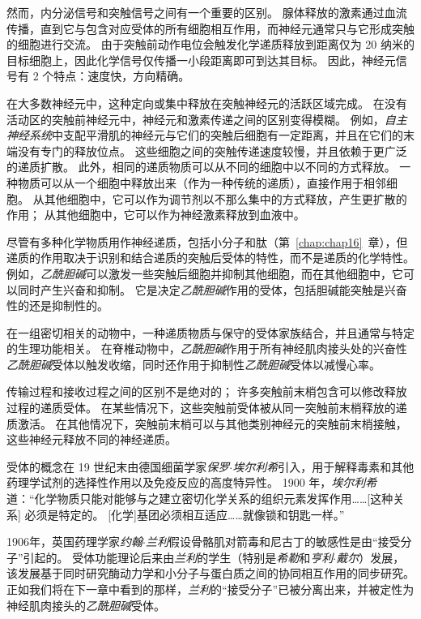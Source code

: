 然而，内分泌信号和突触信号之间有一个重要的区别。
腺体释放的激素通过血流传播，直到它与包含对应受体的所有细胞相互作用，而神经元通常只与它形成突触的细胞进行交流。
由于突触前动作电位会触发化学递质释放到距离仅为 20 纳米的目标细胞上，因此化学信号仅传播一小段距离即可到达其目标。 
因此，神经元信号有 2 个特点：速度快，方向精确。


在大多数神经元中，这种定向或集中释放在突触神经元的活跃区域完成。
在没有活动区的突触前神经元中，神经元和激素传递之间的区别变得模糊。
例如，\textit{自主神经系统}中支配平滑肌的神经元与它们的突触后细胞有一定距离，并且在它们的末端没有专门的释放位点。
这些细胞之间的突触传递速度较慢，并且依赖于更广泛的递质扩散。
此外，相同的递质物质可以从不同的细胞中以不同的方式释放。
一种物质可以从一个细胞中释放出来（作为一种传统的递质），直接作用于相邻细胞。
从其他细胞中，它可以作为调节剂以不那么集中的方式释放，产生更扩散的作用；
从其他细胞中，它可以作为神经激素释放到血液中。


尽管有多种化学物质用作神经递质，包括小分子和肽（第~\ref{chap:chap16}~章），但递质的作用取决于识别和结合递质的突触后受体的特性，而不是递质的化学特性。
例如，\textit{乙酰胆碱}可以激发一些突触后细胞并抑制其他细胞，而在其他细胞中，它可以同时产生兴奋和抑制。
它是决定\textit{乙酰胆碱}作用的受体，包括胆碱能突触是兴奋性的还是抑制性的。


在一组密切相关的动物中，一种递质物质与保守的受体家族结合，并且通常与特定的生理功能相关。
在脊椎动物中，\textit{乙酰胆碱}作用于所有神经肌肉接头处的兴奋性\textit{乙酰胆碱}受体以触发收缩，同时还作用于抑制性\textit{乙酰胆碱}受体以减慢心率。


传输过程和接收过程之间的区别不是绝对的；
许多突触前末梢包含可以修改释放过程的递质受体。
在某些情况下，这些突触前受体被从同一突触前末梢释放的递质激活。
在其他情况下，突触前末梢可以与其他类别神经元的突触前末梢接触，这些神经元释放不同的神经递质。


受体的概念在 19 世纪末由德国细菌学家\textit{保罗$\cdot$埃尔利希}引入，用于解释毒素和其他药理学试剂的选择性作用以及免疫反应的高度特异性。
1900 年，\textit{埃尔利希}道：“化学物质只能对能够与之建立密切化学关系的组织元素发挥作用……[这种关系] 必须是特定的。
[化学]基团必须相互适应……就像锁和钥匙一样。”


1906年，英国药理学家\textit{约翰$\cdot$兰利}假设骨骼肌对箭毒和尼古丁的敏感性是由“接受分子”引起的。
受体功能理论后来由\textit{兰利}的学生（特别是\textit{希勒}和\textit{亨利$\cdot$戴尔}）发展，该发展基于同时研究酶动力学和小分子与蛋白质之间的协同相互作用的同步研究。
正如我们将在下一章中看到的那样，\textit{兰利}的“接受分子”已被分离出来，并被定性为神经肌肉接头的\textit{乙酰胆碱}受体。


